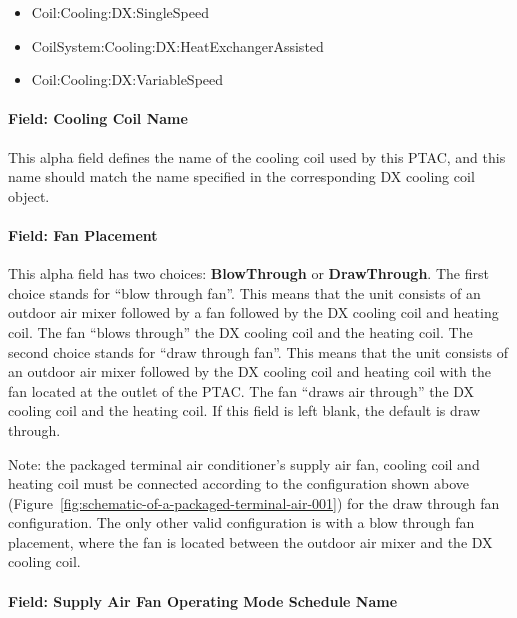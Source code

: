 \begin{itemize}
\item
  Coil:Cooling:DX:SingleSpeed
\item
  CoilSystem:Cooling:DX:HeatExchangerAssisted
\item
  Coil:Cooling:DX:VariableSpeed
\end{itemize}

\paragraph{Field: Cooling Coil Name}\label{field-cooling-coil-name-2-001}

This alpha field defines the name of the cooling coil used by this PTAC, and this name should match the name specified in the corresponding DX cooling coil object.

\paragraph{Field: Fan Placement}\label{field-fan-placement-3-000}

This alpha field has two choices: \textbf{BlowThrough} or \textbf{DrawThrough}. The first choice stands for ``blow through fan''. This means that the unit consists of an outdoor air mixer followed by a fan followed by the DX cooling coil and heating coil. The fan ``blows through'' the DX cooling coil and the heating coil. The second choice stands for ``draw through fan''. This means that the unit consists of an outdoor air mixer followed by the DX cooling coil and heating coil with the fan located at the outlet of the PTAC. The fan ``draws air through'' the DX cooling coil and the heating coil. If this field is left blank, the default is draw through.

Note: the packaged terminal air conditioner's supply air fan, cooling coil and heating coil must be connected according to the configuration shown above (Figure~\ref{fig:schematic-of-a-packaged-terminal-air-001}) for the draw through fan configuration. The only other valid configuration is with a blow through fan placement, where the fan is located between the outdoor air mixer and the DX cooling coil.

\paragraph{Field: Supply Air Fan Operating Mode Schedule Name}\label{field-supply-air-fan-operating-mode-schedule-name-4}

